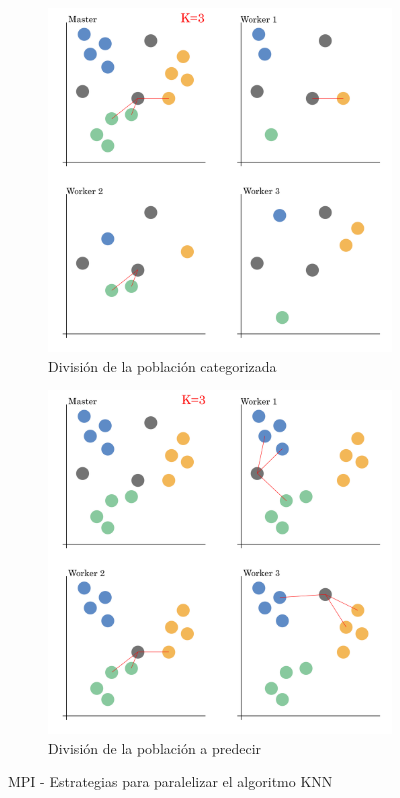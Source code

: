 		\begin{figure}[!h]
			\centering
			
			
			\begin{subfigure}[t]{0.45\textwidth}
				\centering
				\includegraphics[width=\textwidth]{images/chapter_3/knn_mpi1}
				\caption{División de la población categorizada}
				\label{fig:knn1}
			\end{subfigure}
			\hfill
			\begin{subfigure}[t]{0.45\textwidth}
				\centering
				\includegraphics[width=\textwidth]{images/chapter_3/knn_mpi2}
				\caption{División de la población a predecir}
				\label{fig:knn2}
			\end{subfigure}
			
			\caption{MPI - Estrategias para paralelizar el algoritmo KNN}
			\label{fig:knnmpi}
		\end{figure}

